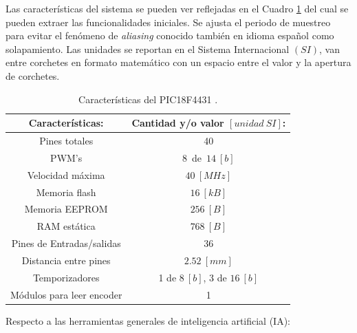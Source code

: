 \documentclass{article}
\begin{document}
Las características del sistema se pueden ver reflejadas en el Cuadro \ref{tabla:carac_pic} del cual se pueden extraer las funcionalidades iniciales. Se ajusta el periodo de muestreo para evitar el fenómeno de \textit{aliasing} conocido también en idioma español como solapamiento. Las unidades se reportan en el Sistema Internacional $(SI)$, van entre corchetes en formato matemático con un espacio entre el valor y la apertura de corchetes.
\begin{table}[H]
\centering
\caption{Características del PIC18F4431 \citep{HernandezBook2013}.} 
\begin{tabular}{|c|c|}\hline
Características: & Cantidad y/o valor $[unidad\ SI]$: \\ \hline
Pines totales & 40\\
PWM's & 8\ de\ $14\ [b]$\\
Velocidad máxima & $40\ [MHz]$\\
Memoria flash & $16\ [kB]$\\
Memoria EEPROM & $256\ [B]$\\
RAM estática & $768\ [B]$\\
Pines de Entradas/salidas & 36\\
Distancia entre pines & $2.52\ [mm]$\\
Temporizadores & 1 de $8\ [b]$, 3 de $16\ [b]$\\
Módulos para leer encoder & 1\\ \hline
\end{tabular}
\label{tabla:carac_pic}
\end{table}

Respecto a las herramientas generales de inteligencia artificial (IA):
\end{document}
